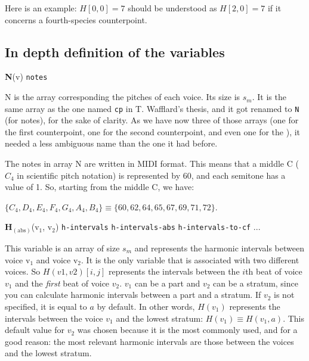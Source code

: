 Here is an example: $H[0, 0] = 7$ should be understood as $H[2, 0] = 7$ if it concerns a fourth-species counterpoint.

\subsection{In depth definition of the variables} \label{section:definition-variables}

\noindent \textbf{N}(v) \hspace{.2cm} \texttt{notes} 

N is the array corresponding the pitches of each voice. Its size is $s_m$. It is the same array as the one named \texttt{cp} in T. Wafflard's thesis, and it got renamed to \texttt{N} (for notes), for the sake of clarity. As we have now three of those arrays (one for the first counterpoint, one for the second counterpoint, and even one for the \cf), it needed a less ambiguous name than the one it had before. 

The notes in array N are written in MIDI format. This means that a middle C ($C_4$ in scientific pitch notation) is represented by 60, and each semitone has a value of 1. So, starting from the middle C, we have:

$\{C_4, D_4, E_4, F_4, G_4, A_4, B_4\} \equiv \{60, 62, 64, 65, 67, 69, 71, 72\}$.




\vspace{.5cm} \noindent \textbf{H}$_{(\text{abs})}$(v$_1$, v$_2$) \hspace{.2cm} \texttt{h-intervals}\hspace{.2cm} \texttt{h-intervals-abs}\hspace{.2cm} \texttt{h-intervals-to-cf}\hspace{.2cm}  ...

This variable is an array of size $s_m$ and represents the harmonic intervals between voice v$_1$ and voice v$_2$. It is the only variable that is associated with two different voices. So $H(v1,v2)[i,j]$ represents the intervals between the $i$th beat of voice $v_1$ and the \textit{first} beat of voice $v_2$. $v_1$ can be a part and $v_2$ can be a stratum, since you can calculate harmonic intervals between a part and a stratum. If $v_2$ is not specified, it is equal to $a$ by default. In other words, $H(v_1)$ represents the intervals between the voice $v_1$ and the lowest stratum: $H(v_1) \equiv H(v_1,a)$. This default value for $v_2$ was chosen because it is the most commonly used, and for a good reason: the most relevant harmonic intervals are those between the voices and the lowest stratum.


